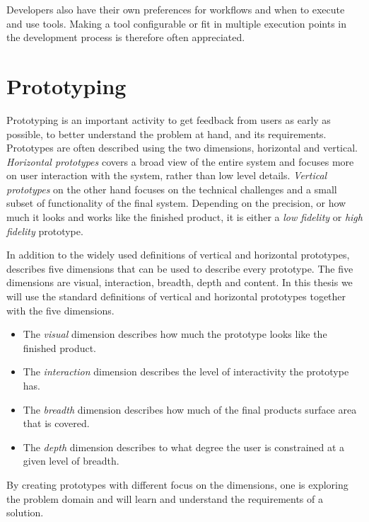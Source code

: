 \documentclass[pdftex,10pt,b5paper,twoside]{report}
\begin{document}
Developers also have their own preferences for workflows and when to execute and use tools. Making a tool configurable or fit in multiple execution points in the development process is therefore often appreciated.

\section{Prototyping}
Prototyping is an important activity to get feedback from users as early as possible, to better understand the problem at hand, and its requirements. Prototypes are often described using the two dimensions, horizontal and vertical. \textit{Horizontal prototypes} covers a broad view of the entire system and focuses more on user interaction with the system, rather than low level details. \textit{Vertical prototypes} on the other hand focuses on the technical challenges and a small subset of functionality of the final system. Depending on the precision, or how much it looks and works like the finished product, it is either a \textit{low fidelity} or \textit{high fidelity} prototype. 

In addition to the widely used definitions of vertical and horizontal prototypes, \cite{prototype-dimensions} describes five dimensions that can be used to describe every prototype. The five dimensions are visual, interaction, breadth, depth and content. In this thesis we will use the standard definitions of vertical and horizontal prototypes together with the five dimensions.  

\begin{itemize}
    \item The \textit{visual} dimension describes how much the prototype looks like the finished product. 
    
    \item The \textit{interaction} dimension describes the level of interactivity the prototype has. 
    
    \item The \textit{breadth} dimension describes how much of the final products surface area that is covered. 
    
    \item The \textit{depth} dimension describes to what degree the user is constrained at a given level of breadth.
\end{itemize}

By creating prototypes with different focus on the dimensions, one is exploring the problem domain and will learn and understand the requirements of a solution.
\cleardoublepage
\end{document}
